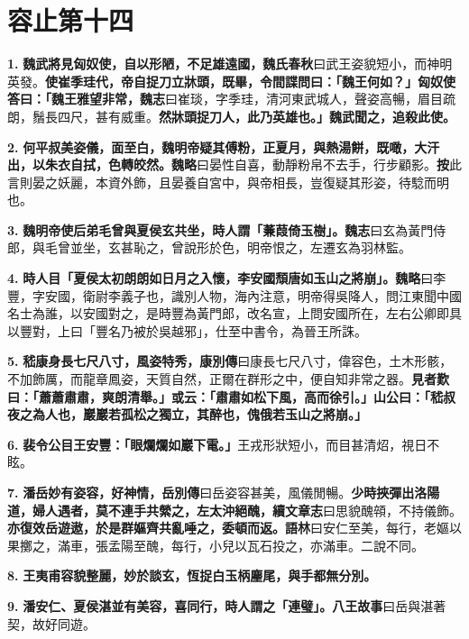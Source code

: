 \chapter{容止第十四}

\textbf{1.} \textbf{魏武將見匈奴使，自以形陋，不足雄遠國，}{\footnotesize \textbf{魏氏春秋}曰武王姿貌短小，而神明英發。}\textbf{使崔季珪代，帝自捉刀立牀頭，既畢，令間諜問曰：「魏王何如？」匈奴使答曰：「魏王雅望非常，}{\footnotesize \textbf{魏志}曰崔琰，字季珪，清河東武城人，聲姿高暢，眉目疏朗，鬚長四尺，甚有威重。}\textbf{然牀頭捉刀人，此乃英雄也。」魏武聞之，追殺此使。}

\textbf{2.} \textbf{何平叔美姿儀，面至白，魏明帝疑其傅粉，正夏月，與熱湯餅，既噉，大汗出，以朱衣自拭，色轉皎然。}{\footnotesize \textbf{魏略}曰晏性自喜，動靜粉帛不去手，行步顧影。\textbf{按}此言則晏之妖麗，本資外飾，且晏養自宮中，與帝相長，豈復疑其形姿，待騐而明也。}

\textbf{3.} \textbf{魏明帝使后弟毛曾與夏侯玄共坐，時人謂「蒹葭倚玉樹」。}{\footnotesize \textbf{魏志}曰玄為黃門侍郎，與毛曾並坐，玄甚恥之，曾說形於色，明帝恨之，左遷玄為羽林監。}

\textbf{4.} \textbf{時人目「夏侯太初朗朗如日月之入懷，李安國頹唐如玉山之將崩」。}{\footnotesize \textbf{魏略}曰李豐，字安國，衛尉李義子也，識別人物，海內注意，明帝得吳降人，問江東聞中國名士為誰，以安國對之，是時豐為黃門郎，改名宣，上問安國所在，左右公卿即具以豐對，上曰「豐名乃被於吳越邪」，仕至中書令，為晉王所誅。}

\textbf{5.} \textbf{嵇康身長七尺八寸，風姿特秀，}{\footnotesize \textbf{康別傳}曰康長七尺八寸，偉容色，土木形骸，不加飾厲，而龍章鳳姿，天質自然，正爾在群形之中，便自知非常之器。}\textbf{見者歎曰：「蕭蕭肅肅，爽朗清舉。」或云：「肅肅如松下風，高而徐引。」山公曰：「嵇叔夜之為人也，巖巖若孤松之獨立，其醉也，傀俄若玉山之將崩。」}

\textbf{6.} \textbf{裴令公目王安豐：「眼爛爛如巖下電。」}{\footnotesize 王戎形狀短小，而目甚清炤，視日不眩。}

\textbf{7.} \textbf{潘岳妙有姿容，好神情，}{\footnotesize \textbf{岳別傳}曰岳姿容甚美，風儀閒暢。}\textbf{少時挾彈出洛陽道，婦人遇者，莫不連手共縈之，左太沖絕醜，}{\footnotesize \textbf{續文章志}曰思貌醜顇，不持儀飾。}\textbf{亦復效岳遊遨，於是群嫗齊共亂唾之，委頓而返。}{\footnotesize \textbf{語林}曰安仁至美，每行，老嫗以果擲之，滿車，張孟陽至醜，每行，小兒以瓦石投之，亦滿車。二說不同。}

\textbf{8.} \textbf{王夷甫容貌整麗，妙於談玄，恆捉白玉柄麈尾，與手都無分別。}

\textbf{9.} \textbf{潘安仁、夏侯湛並有美容，喜同行，時人謂之「連璧」。}{\footnotesize \textbf{八王故事}曰岳與湛著契，故好同遊。}

